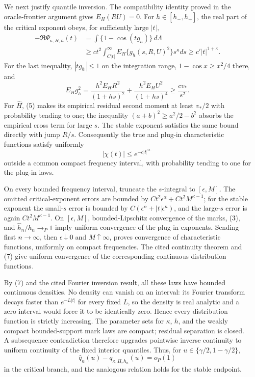 We next justify quantile inversion.  The compatibility identity proved in the oracle-frontier argument gives \(E_H(RU)=0\).  For \(h\in[h_-,h_+]\), the real part of the critical exponent obeys, for sufficiently large \(|t|\),
\[
\begin{split}
 -\Re\Psi_{\kappa,H,h}(t)
 &=\int\{1-\cos(tg_h)\}\,d\Lambda\\
 &\geq c t^2\int_{C|t|}^\infty E_H\{g_h(s,R,U)^2\}s^\kappa ds
 \geq c'|t|^{1+\kappa}.
\end{split} \tag{6}
\]
For the last inequality, \(|tg_h|\leq1\) on the integration range, \(1-\cos x\geq x^2/4\) there, and
\[
 E_Hg_h^2=\frac{h^2E_HR^2}{(1+hs)^2}
 +\frac{h^2E_HU^2}{(1+hs)^4}
 \geq \frac{c v_*}{s^2}.
\]
For \(\widehat H\), (5) makes its empirical residual second moment at least \(v_*/2\) with probability tending to one; the inequality \((a+b)^2\geq a^2/2-b^2\) absorbs the empirical cross term for large \(s\).  The stable exponent satisfies the same bound directly with jump \(R/s\).  Consequently the true and plug-in characteristic functions satisfy uniformly
\[
 |\chi(t)|\leq e^{-c|t|^{\alpha_-}} \tag{7}
\]
outside a common compact frequency interval, with probability tending to one for the plug-in laws.

On every bounded frequency interval, truncate the \(s\)-integral to \([\epsilon,M]\).  The omitted critical-exponent errors are bounded by \(C t^2\epsilon^\alpha+Ct^2M^{\kappa-1}\); for the stable exponent the small-\(s\) error is bounded by \(C(\epsilon^\alpha+|t|\epsilon^\kappa)\), and the large-\(s\) error is again \(Ct^2M^{\kappa-1}\).  On \([\epsilon,M]\), bounded-Lipschitz convergence of the marks, (3), and \(\widehat h_n/h_n\to_P1\) imply uniform convergence of the plug-in exponents.  Sending first \(n\to\infty\), then \(\epsilon\downarrow0\) and \(M\uparrow\infty\), proves convergence of characteristic functions, uniformly on compact frequencies.  The cited continuity theorem and (7) give uniform convergence of the corresponding continuous distribution functions.

By (7) and the cited Fourier inversion result, all these laws have bounded continuous densities.  No density can vanish on an interval: its Fourier transform decays faster than \(e^{-L|t|}\) for every fixed \(L\), so the density is real analytic and a zero interval would force it to be identically zero.  Hence every distribution function is strictly increasing.  The parameter sets for \(\kappa\), \(h\), and the weakly compact bounded-support mark laws are compact; residual separation is closed.  A subsequence contradiction therefore upgrades pointwise inverse continuity to uniform continuity of the fixed interior quantiles.  Thus, for \(u\in\{\gamma/2,1-\gamma/2\}\),
\[
 \widehat q_n(u)-q_{\kappa,H,h_n}(u)=o_P(1) \tag{8}
\]
in the critical branch, and the analogous relation holds for the stable endpoint.

